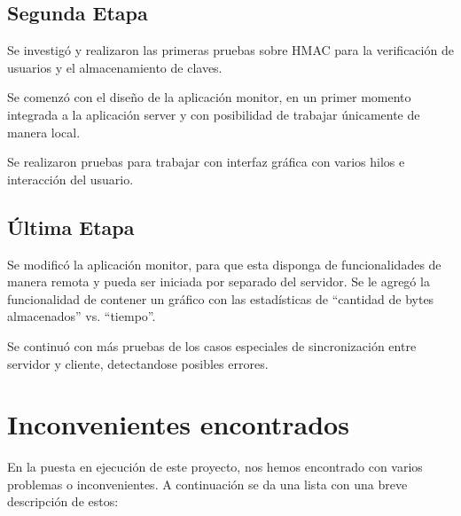 \documentclass{article}
\begin{document}
\subsection{Segunda Etapa}
\smallskip

	Se investigó y realizaron las primeras pruebas sobre HMAC para la verificación de usuarios y el almacenamiento de claves.
	\par
	Se comenzó con el diseño de la aplicación monitor, en un primer momento integrada a la aplicación server y con posibilidad de trabajar únicamente de manera local.
	\par
	Se realizaron pruebas para trabajar con interfaz gráfica con varios hilos e interacción del usuario.
\bigskip


\subsection{Última Etapa}
\smallskip

	Se modificó la aplicación monitor, para que esta disponga de funcionalidades de manera remota y pueda ser iniciada por separado del servidor. Se le agregó la funcionalidad de contener un gráfico con las estadísticas de “cantidad de bytes almacenados” vs. “tiempo”.
	\par
	Se continuó con más pruebas de los casos especiales de sincronización entre servidor y cliente, detectandose posibles errores. 
\bigskip\medskip




\section{Inconvenientes encontrados}

	En la puesta en ejecución de este proyecto, nos hemos encontrado con varios problemas o inconvenientes. A continuación se da una lista con una breve descripción de estos:
\end{document}

